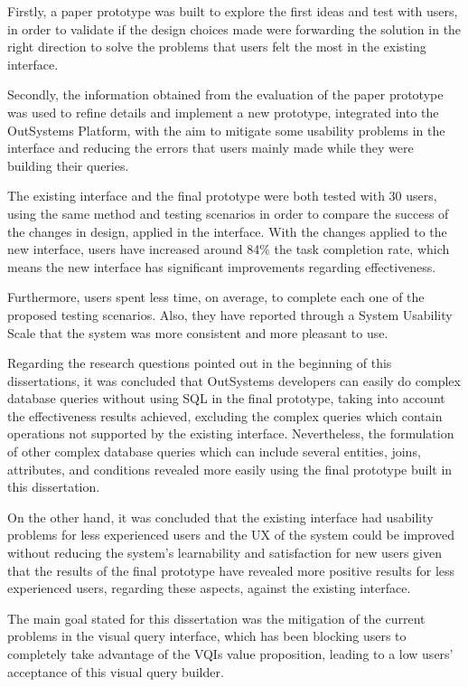 Firstly, a paper prototype was built to explore the first ideas and test with users, in order to validate if the design choices made were forwarding the solution in the right direction to solve the problems that users felt the most in the existing interface.

Secondly, the information obtained from the evaluation of the paper prototype was used to refine details and implement a new prototype, integrated into the OutSystems Platform, with the aim to mitigate some usability problems in the interface and reducing the errors that users mainly made while they were building their queries.

The existing interface and the final prototype were both tested with 30 users, using the same method and testing scenarios in order to compare the success of the changes in design, applied in the interface. With the changes applied to the new interface, users have increased around 84\% the task completion rate, which means the new interface has significant improvements regarding effectiveness.

Furthermore, users spent less time, on average, to complete each one of the proposed testing scenarios. Also, they have reported through a System Usability Scale \cite{system_usability_scale} that the system was more consistent and more pleasant to use.

Regarding the research questions pointed out in the beginning of this dissertations, it was concluded that OutSystems developers can easily do complex database queries without using SQL in the final prototype, taking into account the effectiveness results achieved, excluding the complex queries which contain operations not supported by the existing interface. Nevertheless, the formulation of other complex database queries which can include several entities, joins, attributes, and conditions revealed more easily using the final prototype built in this dissertation.

On the other hand, it was concluded that the existing interface had usability problems for less experienced users and the \gls{UX} of the system could be improved without reducing the system's learnability and satisfaction for new users given that the results of the final prototype have revealed more positive results for less experienced users, regarding these aspects, against the existing interface.

The main goal stated for this dissertation was the mitigation of the current problems in the visual query interface, which has been blocking users to completely take advantage of the \glspl{VQI} value proposition, leading to a low users' acceptance of this visual query builder.

